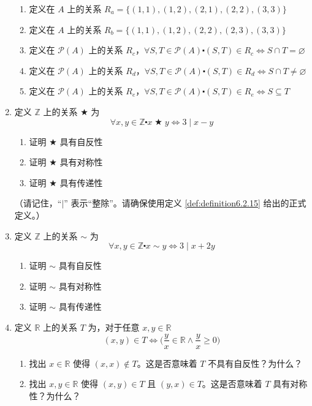 \begin{enumerate}[label=(\arabic*)]
    \begin{enumerate}[label=(\alph*)]
        \item 定义在 $A$ 上的关系 $R_a = \{(1, 1),(1, 2),(2, 1),(2, 2),(3, 3)\}$
        \item 定义在 $A$ 上的关系 $R_b = \{(1, 1),(1, 2),(2, 2),(2, 3),(3, 3)\}$
        \item 定义在 $\mathcal{P}(A)$ 上的关系 $R_c$，$\forall S, T \in \mathcal{P}(A) \centerdot (S, T) \in R_c \iff S \cap T = \varnothing$
        \item 定义在 $\mathcal{P}(A)$ 上的关系 $R_d$，$\forall S, T \in \mathcal{P}(A) \centerdot (S, T) \in R_d \iff S \cap T \ne \varnothing$
        \item 定义在 $\mathcal{P}(A)$ 上的关系 $R_e$，$\forall S, T \in \mathcal{P}(A) \centerdot (S, T) \in R_e \iff S \subseteq T$
    \end{enumerate}
    \item 定义 $\mathbb{Z}$ 上的关系 $\bigstar$ 为
    \[\forall x, y \in \mathbb{Z} \centerdot x \;\bigstar\; y \iff 3 \mid x - y\]
    \begin{enumerate}[label=(\alph*)]
        \item 证明 $\bigstar$ 具有自反性
        \item 证明 $\bigstar$ 具有对称性
        \item 证明 $\bigstar$ 具有传递性
    \end{enumerate}
    （请记住，``$\mid$'' 表示``整除''。请确保使用定义 \ref{def:definition6.2.15} 给出的正式定义。）\label{exc:exercises6.2.2}
    \item 定义 $\mathbb{Z}$ 上的关系 $\sim$ 为
    \[\forall x, y \in \mathbb{Z} \centerdot x \sim y \iff 3 \mid x + 2y\]
    \begin{enumerate}[label=(\alph*)]
        \item 证明 $\sim$ 具有自反性
        \item 证明 $\sim$ 具有对称性
        \item 证明 $\sim$ 具有传递性
    \end{enumerate} \label{exc:exercises6.2.3}
    \item 定义 $\mathbb{R}$ 上的关系 $T$ 为，对于任意 $x, y \in \mathbb{R}$
    \[(x, y) \in T \iff \Big(\frac{y}{x} \in \mathbb{R} \land \frac{y}{x} \ge 0\Big)\]
    \begin{enumerate}[label=(\alph*)]
        \item 找出 $x \in \mathbb{R}$ 使得 $(x,x) \notin T$。这是否意味着 $T$ 不具有自反性？为什么？
        \item 找出 $x,y \in \mathbb{R}$ 使得 $(x,y) \in T$ 且 $(y,x) \in T$。这是否意味着 $T$ 具有对称性？为什么？

\end{enumerate}
\end{enumerate}
